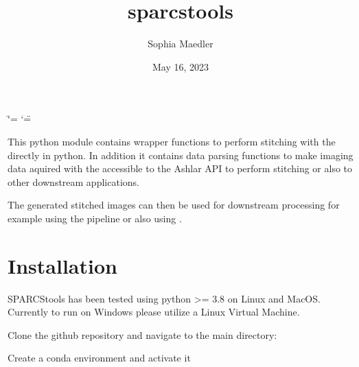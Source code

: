 \documentclass[a4paper,10pt,english,openany,oneside]{sphinxmanual}
\title{sparcstools}
\date{May 16, 2023}
\author{Sophia Maedler}
\begin{document}
\ifdefined\shorthandoff
  \ifnum\catcode`\=\string=\active\shorthandoff{=}\fi
  \ifnum\catcode`\"=\active{}\fi
\fi

\pagestyle{empty}
\sphinxmaketitle
\pagestyle{plain}
\sphinxtableofcontents
\pagestyle{normal}
\label{\detokenize{index::doc}}


\sphinxAtStartPar
This python module contains wrapper functions to perform stitching with the  directly in python. In addition it contains
data parsing functions to make imaging data aquired with the  accessible to the Ashlar API to perform stitching
or also to other downstream applications.

\sphinxAtStartPar
The generated stitched images can then be used for downstream processing for example using the  pipeline or also using .


\chapter{Installation}
\label{\detokenize{index:installation}}
\sphinxAtStartPar
SPARCStools has been tested using python \textgreater{}= 3.8 on Linux and MacOS. Currently to run on Windows please utilize a Linux Virtual Machine.

\sphinxAtStartPar
Clone the github repository and navigate to the main directory:

\begin{sphinxVerbatim}[commandchars=\\\{\}]
  
 
\end{sphinxVerbatim}

\sphinxAtStartPar
Create a conda environment and activate it

\begin{sphinxVerbatim}[commandchars=\\\{\}]
    
  
\end{sphinxVerbatim}
\end{document}
